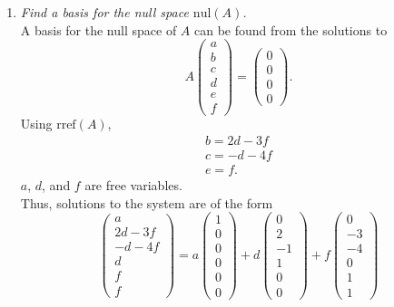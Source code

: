 \documentclass[12pt]{article}
\begin{document}
\begin{enumerate}[label=(\alph*)]
	\item \textit{Find a basis for the null space $\text{nul}(A)$.}
	\\[\baselineskip]
	A basis for the null space of $A$ can be found from the solutions to
	\begin{equation*}
		A \begin{pmatrix} a \\ b \\ c \\ d \\ e \\ f \end{pmatrix}
		=
		\begin{pmatrix} 0 \\ 0 \\ 0 \\ 0 \end{pmatrix}
		.
	\end{equation*}
	Using $\text{rref}(A)$,
	\begin{gather*}
		b = 2d - 3f \\
		c = -d - 4f \\
		e = f
		.
	\end{gather*}
	$a$, $d$, and $f$ are free variables. \\
	Thus, solutions to the system are of the form
	\begin{equation*}
		\begin{pmatrix} a \\ 2d - 3f \\ -d - 4f \\ d \\ f \\ f \end{pmatrix}
		=
		a \begin{pmatrix} 1 \\ 0 \\ 0 \\ 0 \\ 0 \\ 0 \end{pmatrix}
		+
		d \begin{pmatrix} 0 \\ 2 \\ -1 \\ 1 \\ 0 \\ 0 \end{pmatrix}
		+
		f \begin{pmatrix} 0 \\ -3 \\ -4 \\ 0 \\ 1 \\ 1 \end{pmatrix}

\end{equation*}
\end{enumerate}
\end{document}
